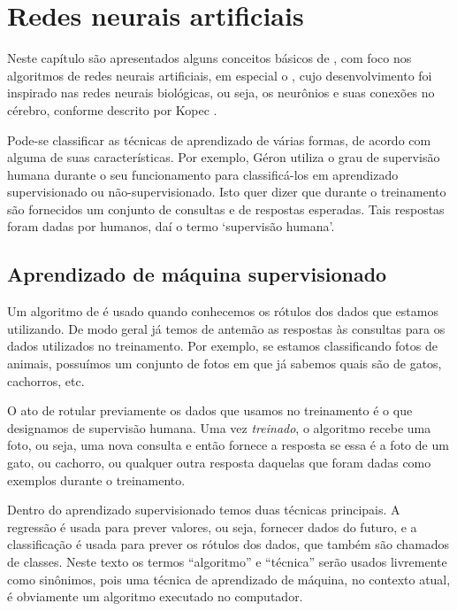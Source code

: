 
\chapter{Redes neurais artificiais}
\label{cap:redes}

Neste capítulo são apresentados alguns conceitos básicos de , com foco nos algoritmos de redes neurais artificiais, em especial o , cujo desenvolvimento foi inspirado nas redes neurais biológicas, ou seja, os neurônios e suas conexões no cérebro, conforme descrito por Kopec \citep{classic}.

Pode-se classificar as técnicas de aprendizado de várias formas, de acordo com alguma de suas características. Por exemplo, Géron \citep{hands} utiliza o grau de supervisão humana durante o seu funcionamento para classificá-los em aprendizado supervisionado ou não-supervisionado. Isto quer dizer que durante o treinamento são fornecidos um conjunto de consultas e de respostas esperadas. Tais respostas foram dadas por humanos, daí o termo `supervisão humana'.

\section{Aprendizado de máquina supervisionado}

 Um algoritmo de  é usado quando conhecemos os rótulos dos dados que estamos utilizando. De modo geral já temos de antemão as respostas às consultas para os dados utilizados no treinamento. Por exemplo, se estamos classificando fotos de animais, possuímos um conjunto de fotos em que já sabemos quais são de gatos, cachorros, etc.

 O ato de rotular previamente os dados que usamos no treinamento é o que designamos de supervisão humana. Uma vez \emph{treinado}, o algoritmo recebe uma foto, ou seja, uma nova consulta e então fornece a resposta se essa é a foto de um gato, ou cachorro, ou qualquer outra resposta daquelas que foram dadas como exemplos durante o treinamento.

Dentro do aprendizado supervisionado temos duas técnicas principais. A regressão é usada para prever valores, ou seja, fornecer dados do futuro, e a classificação é usada para prever os rótulos dos dados, que também são chamados de classes. Neste texto os termos ``algoritmo'' e ``técnica'' serão usados livremente como sinônimos, pois uma técnica de aprendizado de máquina, no contexto atual, é obviamente um algoritmo executado no computador.

